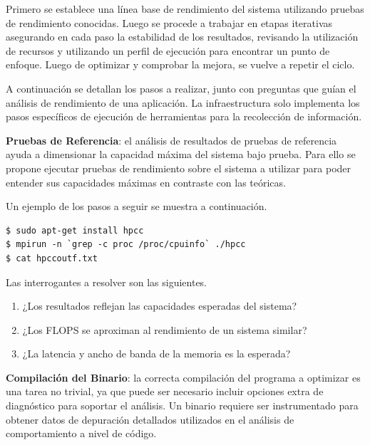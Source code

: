 \documentclass[a4paper]{report}
\begin{document}
Primero se establece una línea base de rendimiento del sistema utilizando pruebas de rendimiento conocidas.
Luego se procede a trabajar en etapas iterativas asegurando en cada paso la estabilidad de los resultados, revisando la utilización de recursos y utilizando un perfil de ejecución para encontrar un punto de enfoque. Luego de optimizar y comprobar la mejora, se vuelve a repetir el ciclo.

\bigskip

A continuación se detallan los pasos a realizar, junto con preguntas que guían el análisis de rendimiento de una aplicación.
La infraestructura solo implementa los pasos específicos de ejecución de herramientas para la recolección de información.

\bigskip

{\bf Pruebas de Referencia}: el análisis de resultados de pruebas de referencia ayuda a dimensionar la capacidad máxima del sistema bajo prueba. Para ello se propone ejecutar pruebas de rendimiento sobre el sistema a utilizar para poder entender sus capacidades máximas en contraste con las teóricas.

\bigskip

Un ejemplo de los pasos a seguir se muestra a continuación.

\begin{lstlisting}[caption={Instalación de HPCC},label={lst:hpcc}]
$ sudo apt-get install hpcc
$ mpirun -n `grep -c proc /proc/cpuinfo` ./hpcc
$ cat hpccoutf.txt
\end{lstlisting}

Las interrogantes a resolver son las siguientes.

\begin{enumerate}
\item ¿Los resultados reflejan las capacidades esperadas del sistema?
\item ¿Los FLOPS se aproximan al rendimiento de un sistema similar?
\item ¿La latencia y ancho de banda de la memoria es la esperada?
\end{enumerate}

\bigskip

{\bf Compilación del Binario}: la correcta compilación del programa a optimizar es una tarea no trivial, ya que puede ser necesario incluir opciones extra de diagnóstico para soportar el análisis. Un binario requiere ser instrumentado para obtener datos de depuración detallados utilizados en el análisis de comportamiento a nivel de código.
\end{document}
